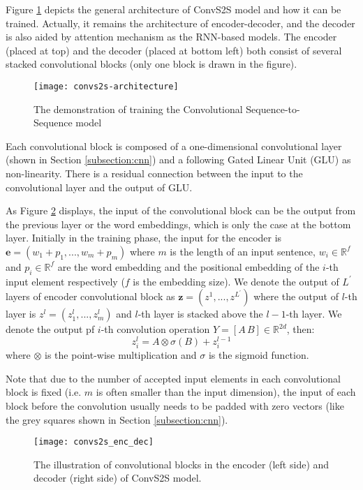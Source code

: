 Figure \ref{figure:convs2s model} depicts the general architecture of ConvS2S model and how it can be trained. Actually, it remains the architecture of encoder-decoder, and the decoder is also aided by attention mechanism as the RNN-based models. The encoder (placed at top) and the decoder (placed at bottom left) both consist of several stacked convolutional blocks (only one block is drawn in the figure).
\begin{figure}[h]
\texttt{[image: convs2s-architecture]}
\centering
\caption{The demonstration of training the Convolutional Sequence-to-Sequence model \cite{gehring2017convs2s}}
\label{figure:convs2s model}
\end{figure}
Each convolutional block is composed of a one-dimensional convolutional layer (shown in Section \ref{subsection:cnn}) and a following Gated Linear Unit (GLU) as non-linearity. There is a residual connection between the input to the convolutional layer and the output of GLU.


As Figure \ref{figure:convs2s enc dec} displays, the input of the convolutional block can be the output from the previous layer or the word embeddings, which is only the case at the bottom layer. Initially in the training phase, the input for the encoder is $ \textbf{e} = (w_{1}+p_{1},...,w_{m}+p_{m}) $ where $ m $ is the length of an input sentence, $ w_{i} \in \mathbb{R}^{f} $ and $ p_{i} \in \mathbb{R}^{f} $ are the word embedding and the positional embedding of the $ i $-th input element respectively ($ f $ is the embedding size). We denote the output of $ L^{'} $ layers of encoder convolutional block as $ \textbf{z} = (z^{1},...,z^{L^{'}}) $ where the output of $ l $-th layer is $ z^{l} = (z_{1}^{l},...,z_{m}^{l}) $ and $ l $-th layer is stacked above the $ l-1 $-th layer. We denote the output pf $ i $-th convolution operation $ Y = [A\,B] \in \mathbb{R}^{2d} $, then:
\[ z_{i}^{l} = A \otimes \sigma(B) + z_{i}^{l-1} \]
where $ \otimes $ is the point-wise multiplication and $ \sigma $ is the sigmoid function.

Note that due to the number of accepted input elements in each convolutional block is fixed (i.e. $ m $ is often smaller than the input dimension), the input of each block before the convolution usually needs to be padded with zero vectors (like the grey squares shown in Section \ref{subsection:cnn}).
 
\begin{figure}[h]
\texttt{[image: convs2s\_enc\_dec]}
\centering
\caption{The illustration of convolutional blocks in the encoder (left side) and decoder (right side) of ConvS2S model.}
\label{figure:convs2s enc dec}
\end{figure}

